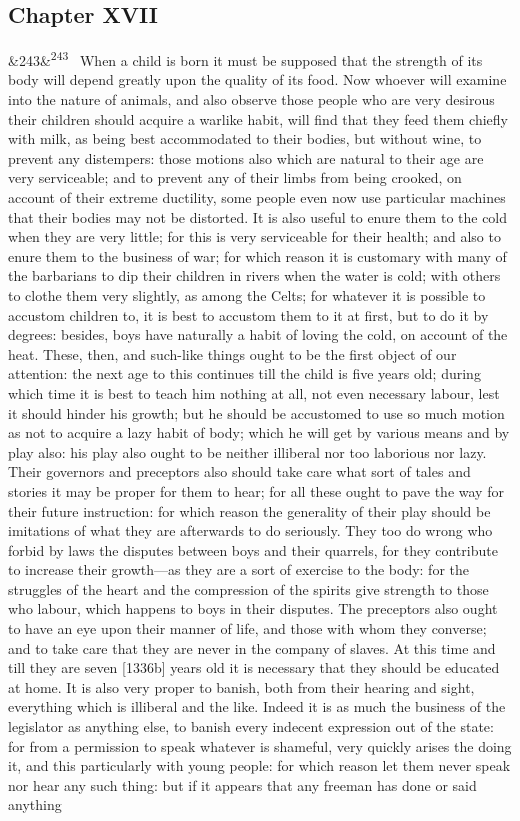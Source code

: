 \documentclass[12pt]{article}
\newcommand{\para}[1][]{\par\noindent\ifx&#1&\else\textsuperscript{\footnotesize #1}~\fi}
\begin{document}
\subsection*{Chapter XVII}

\para[243] When a child is born it must be supposed that the strength of its body will depend greatly upon the quality of its food. Now whoever will examine into the nature of animals, and also observe those people who are very desirous their children should acquire a warlike habit, will find that they feed them chiefly with milk, as being best accommodated to their bodies, but without wine, to prevent any distempers: those motions also which are natural to their age are very serviceable; and to prevent any of their limbs from being crooked, on account of their extreme ductility, some people even now use particular machines that their bodies may not be distorted. It is also useful to enure them to the cold when they are very little; for this is very serviceable for their health; and also to enure them to the business of war; for which reason it is customary with many of the barbarians to dip their children in rivers when the water is cold; with others to clothe them very slightly, as among the Celts; for whatever it is possible to accustom children to, it is best to accustom them to it at first, but to do it by degrees: besides, boys have naturally a habit of loving the cold, on account of the heat. These, then, and such-like things ought to be the first object of our attention: the next age to this continues till the child is five years old; during which time it is best to teach him nothing at all, not even necessary labour, lest it should hinder his growth; but he should be accustomed to use so much motion as not to acquire a lazy habit of body; which he will get by various means and by play also: his play also ought to be neither illiberal nor too laborious nor lazy. Their governors and preceptors also should take care what sort of tales and stories it may be proper for them to hear; for all these ought to pave the way for their future instruction: for which reason the generality of their play should be imitations of what they are afterwards to do seriously. They too do wrong who forbid by laws the disputes between boys and their quarrels, for they contribute to increase their growth---as they are a sort of exercise to the body: for the struggles of the heart and the compression of the spirits give strength to those who labour, which happens to boys in their disputes. The preceptors also ought to have an eye upon their manner of life, and those with whom they converse; and to take care that they are never in the company of slaves. At this time and till they are seven [1336b] years old it is necessary that they should be educated at home. It is also very proper to banish, both from their hearing and sight, everything which is illiberal and the like. Indeed it is as much the business of the legislator as anything else, to banish every indecent expression out of the state: for from a permission to speak whatever is shameful, very quickly arises the doing it, and this particularly with young people: for which reason let them never speak nor hear any such thing: but if it appears that any freeman has done or said anything 
\end{document}
